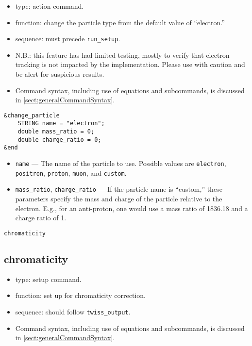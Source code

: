 \documentclass[11pt]{article}
\begin{document}
\begin{itemize}
\item type: action command.
\item function: change the particle type from the default value of ``electron.''
\item sequence: must precede \verb|run_setup|.
\item N.B.: this feature has had limited testing, mostly to verify that electron tracking is not
 impacted by the implementation.  Please use with caution and be alert for suspicious results.
\item Command syntax, including use of equations and subcommands, is discussed in \ref{sect:generalCommandSyntax}.
\end{itemize}

\begin{verbatim}
&change_particle
    STRING name = "electron";
    double mass_ratio = 0;
    double charge_ratio = 0;
&end
\end{verbatim}

\begin{itemize}
\item \verb|name| --- The name of the particle to use.  Possible values are \verb|electron|, \verb|positron|,
  \verb|proton|, \verb|muon|, and \verb|custom|.
\item \verb|mass_ratio|, \verb|charge_ratio| --- If the particle name is ``custom,'' these parameters specify the
  mass and charge of the particle relative to the electron.  E.g., for an anti-proton, one would use
  a mass ratio of 1836.18 and a charge ratio of 1.
\end{itemize}

\newpage
\begin{center}{\Large\verb|chromaticity|}\end{center}
\subsection{chromaticity \label{subsec:chromaticity}}

\begin{itemize}
\item type: setup command.
\item function: set up for chromaticity correction.
\item sequence: should follow \verb|twiss_output|.
\item Command syntax, including use of equations and subcommands, is discussed in \ref{sect:generalCommandSyntax}.
\end{itemize}
\end{document}
